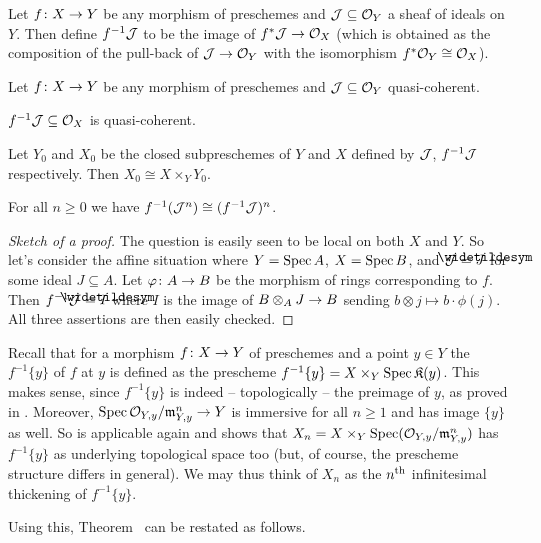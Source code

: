 \documentclass[a4paper,parskip=half,numbers=enddot, DIV=12]{scrreprt}
\renewcommand{\geq}{\geqslant}
\begin{document}
\begin{defi}
	Let $f\colon X\morphism Y$ be any morphism of preschemes and $\mathcal{J}\subseteq \mathcal{O}_Y$ a sheaf of ideals on $Y$. Then define $f^{-1}\mathcal{J}$ to be the image of $f^*\Jj\morphism\Oo_X$ (which is obtained as the composition of the pull-back of $\Jj\morphism \Oo_Y$ with the isomorphism $f^*\mathcal{O}_Y\cong \mathcal{O}_X$).
\end{defi}
\begin{lem}
	Let $f\colon X\morphism Y$ be any morphism of preschemes and $\mathcal{J}\subseteq \mathcal{O}_Y$ quasi-coherent.
	\begin{alphanumerate}
		\item $f^{-1}\mathcal{J}\subseteq \mathcal{O}_X$ is quasi-coherent.
		\item Let $Y_0$ and $X_0$ be the closed subpreschemes of $Y$ and $X$ defined by $\mathcal{J}$, $f^{-1}\mathcal{J}$ respectively. Then $X_0\cong X\times_YY_0$.
		\item For all $n\geq 0$ we have $f^{-1}(\mathcal{J}^n)\cong (f^{-1}\mathcal{J})^n$.
	\end{alphanumerate}
\end{lem}
\begin{proof}[Sketch of a proof]
	The question is easily seen to be local on both $X$ and $Y$. So let's consider the affine situation where $Y=\operatorname{Spec} A$, $X=\operatorname{Spec} B$, and $\Jj=\snake{J}$ for some ideal $J\subseteq A$. Let $\phi\colon A\morphism B$ be the morphism of rings corresponding to $f$. Then $f^{-1}\Jj=\snake{I}$ where $I$ is the image of $B\otimes_AJ\morphism B$ sending $b\otimes j\mapsto b\cdot \phi(j)$. All three assertions are then easily checked.
\end{proof}
\begin{rem}
	Recall that for a morphism $f\colon X\morphism Y$ of preschemes and a point $y\in Y$ the  $f^{-1}\{y\}$ of $f$ at $y$ is defined as the prescheme $f^{-1}\{y\}=X\times_Y\operatorname{Spec} \mathfrak{K}(y)$. This makes sense, since $f^{-1}\{y\}$ is indeed -- topologically -- the preimage of $y$, as proved in \cite[Corollary~1.3.3]{alggeo1}. Moreover, $\Spec \Oo_{Y,y}/\mm_{Y,y}^n\morphism Y$ is immersive for all $n\geq 1$ and has image $\{y\}$ as well. So \cite[Corollary~1.3.3]{alggeo1} is applicable again and shows that $X_n=X\times_Y\operatorname{Spec} (\mathcal{O}_{Y,y}/\mathfrak{m}_{Y,y}^n)$ has $f^{-1}\{y\}$ as underlying topological space too (but, of course, the prescheme structure differs in general). We may thus think of $X_n$ as the $n^{\text{th}}$ infinitesimal thickening of $f^{-1}\{y\}$. 
\end{rem}
Using this, Theorem~ can be restated as follows.
\end{document}
